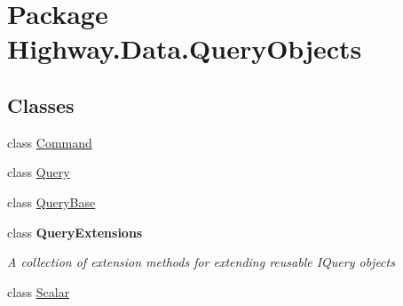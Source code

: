 \hypertarget{namespace_highway_1_1_data_1_1_query_objects}{\section{Package Highway.\-Data.\-Query\-Objects}
\label{namespace_highway_1_1_data_1_1_query_objects}
}
\subsection*{Classes}
\begin{DoxyCompactItemize}
\item 
class \hyperlink{class_highway_1_1_data_1_1_query_objects_1_1_command}{Command}
\begin{DoxyCompactList}\small\item\em \end{DoxyCompactList}\item 
class \hyperlink{class_highway_1_1_data_1_1_query_objects_1_1_query-g}{Query}
\item 
class \hyperlink{class_highway_1_1_data_1_1_query_objects_1_1_query_base}{Query\-Base}
\item 
class {\bfseries Query\-Extensions}
\begin{DoxyCompactList}\small\item\em A collection of extension methods for extending reusable I\-Query objects \end{DoxyCompactList}\item 
class \hyperlink{class_highway_1_1_data_1_1_query_objects_1_1_scalar-g}{Scalar}
\end{DoxyCompactItemize}
